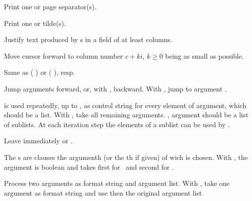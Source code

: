 \begin{LIST}{1cm}
\begin{LIST}{.5cm}
    Print one or  page separator(s).

    Print one or  tilde(s).

    Justify text produced by s in a field of at least
     columns.

    Move cursor forward to column number $c + ki$, $k \geq 0$ being as small
    as possible.

    Same as (  ) or
    (  ), resp.

    Jump  arguments forward, or, with \kwd{:}, backward. With
    , jump to argument .

     is used repeatedly, up to , as control
    string for every element of argument, which should be a list. With
    , take all remaining arguments. \kwd{:}, argument should be
    a list of sublists. At each iteration step the elements of a
    sublist can be used by . 

    \IT{\KWD{\TLD\^{}}}
    Leave immediately \kwd{\TLD\boldmath{$<$}} or \kwd{\TLD\boldmath{$\{$}}.

    The s are clauses the argumenth (or the th if given) of wich is chosen. With
    \kwd{:}, the argument is boolean and takes first  for \NIL\ and
    second  for \T.

    Process two arguments as format string and argument list. With
    , take one argument as format string and use then the
    original argument list


\end{LIST}
\end{LIST}
